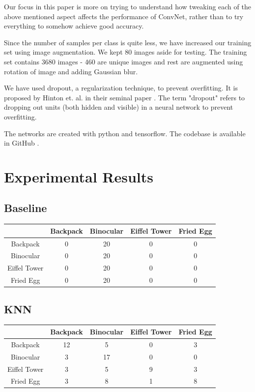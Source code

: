\documentclass{article} %
\begin{document}
Our focus in this paper is more on trying to understand how tweaking each of the above mentioned aspect affects the performance of ConvNet, rather than to try everything to somehow achieve good accuracy.
\par Since the number of samples per class is quite less, we have increased our training set using image augmentation. We kept 80 images aside for testing. The training set contains 3680 images - 460 are unique images and rest are augmented using rotation of image and adding Gaussian blur.  

We have used dropout, a regularization technique, to prevent overfitting. It is proposed by Hinton et. al. in their seminal paper \cite{dropout_paper}. The term "dropout" refers to dropping out units (both hidden and visible) in a neural network to prevent overfitting.

The networks are created with python and tensorflow. The codebase is available in GitHub \cite{cnn_github}.

\section{Experimental Results}

\subsection{Baseline}

\begin{tabular}{|c|c|c|c|c|}
\hline 
&
Backpack &
Binocular &
Eiffel Tower &
Fried Egg \\
\hline 
Backpack &
0 &
20 &
0 &
0 \\
\hline 
Binocular &
0 &
20 &
0 &
0 \\
\hline 
Eiffel Tower &
0 &
20 &
0 &
0 \\
\hline
Fried Egg &
0 &
20 &
0 &
0 \\
\hline
\end{tabular}


\subsection{KNN}

\begin{tabular}{|c|c|c|c|c|}
\hline 
&
Backpack &
Binocular &
Eiffel Tower &
Fried Egg \\
\hline 
Backpack &
12 &
5 &
0 &
3 \\
\hline 
Binocular &
3 &
17 &
0 &
0 \\
\hline 
Eiffel Tower &
3 &
5 &
9 &
3 \\
\hline
Fried Egg &
3 &
8 &
1 &
8 \\
\hline
\end{tabular}
\end{document}
